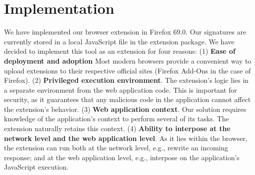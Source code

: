\section{Implementation} \label{implementation}

We have implemented our browser extension in Firefox 69.0. Our signatures are currently stored in a local JavaScript file in the extension package. We have decided to implement this tool as an extension for four reasons:
(1) \textbf{Ease of deployment and adoption} Most modern browsers provide a convenient way to upload extensions to their respective official sites (Firefox Add-Ons in the case of Firefox). %
(2) \textbf{Privileged execution environment}. The extension's logic lies in a separate environment from the web application code. This is important for security, as it guarantees that any malicious code in the application cannot affect the extension's behavior. %
(3) \textbf{Web application context}. Our solution requires knowledge of the application's context to perform several of its tasks. %
The extension naturally retains this context.
(4) \textbf{Ability to interpose at the network level and the web application level}. As it lies within the browser, the extension can run both at the network level, e.g., rewrite an incoming response; and at the web application level, e.g., interpose on the application's JavaScript execution. %

